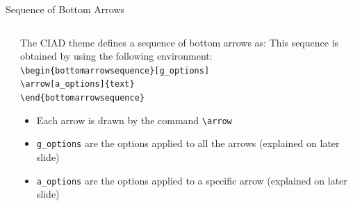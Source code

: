 \documentclass[english,sectioncirclenumberstyle]{ciadbeamer}
\begin{document}
\begin{frame}[t]{Sequence of Bottom Arrows}
	\begin{columns}
		\begin{column}{.2\linewidth}
			\begin{bottomarrowsequence}
			\end{bottomarrowsequence} \\[.5cm]
		\end{column}
		\begin{column}{.8\linewidth}
			The CIAD theme defines a sequence of bottom arrows as:
			\vspace{.5cm}
			This sequence is obtained by using the following environment: \\
			\texttt{{\textbackslash}begin\{bottomarrowsequence\}[g\_options]} \\
			\hspace{.5cm}\texttt{{\textbackslash}arrow[a\_options]\{text\}} \\
			\texttt{{\textbackslash}end\{bottomarrowsequence\}}
			
			\begin{itemize}
			\item Each arrow is drawn by the command \texttt{{\textbackslash}arrow}
			\item \texttt{g\_options} are the options applied to all the arrows (explained on later slide)
			\item \texttt{a\_options} are the options applied to a specific arrow (explained on later slide)
			\end{itemize}
		\end{column}
	\end{columns}
\end{frame}
\end{document}
